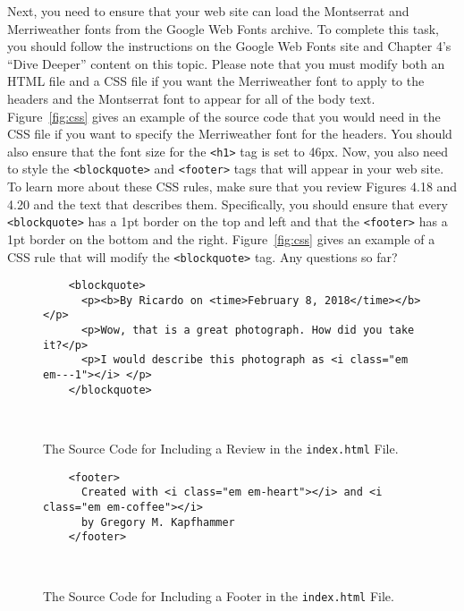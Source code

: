 \documentclass[11pt]{article}
\newcommand{\mainprogram}{\lstinline{index.html}}
\newcommand{\program}[1]{\lstinline{#1}}
\begin{document}
Next, you need to ensure that your web site can load the Montserrat and
Merriweather fonts from the Google Web Fonts archive. To complete this task, you
should follow the instructions on the Google Web Fonts site and Chapter 4's
``Dive Deeper'' content on this topic. Please note that you must modify both an
HTML file and a CSS file if you want the Merriweather font to apply to the
headers and the Montserrat font to appear for all of the body text.
Figure~\ref{fig:css} gives an example of the source code that you would need in
the CSS file if you want to specify the Merriweather font for the headers. You
should also ensure that the font size for the \program{<h1>} tag is set to 46px.
Now, you also need to style the \program{<blockquote>} and \program{<footer>}
tags that will appear in your web site. To learn more about these CSS rules,
make sure that you review Figures 4.18 and 4.20 and the text that describes
them. Specifically, you should ensure that every \program{<blockquote>} has a
1pt border on the top and left and that the \program{<footer>} has a 1pt border
on the bottom and the right. Figure~\ref{fig:css} gives an example of a CSS rule
that will modify the \program{<blockquote>} tag. Any questions so far?

\begin{figure}[t]
  \centering
  \begin{verbatim}
    <blockquote>
      <p><b>By Ricardo on <time>February 8, 2018</time></b></p>
      <p>Wow, that is a great photograph. How did you take it?</p>
      <p>I would describe this photograph as <i class="em em---1"></i> </p>
    </blockquote>
  \end{verbatim}
  \vspace*{-.35in}
  \caption{The Source Code for Including a Review in the \mainprogram{} File.}~\label{fig:code}
  \vspace*{-.1in}
\end{figure}

\begin{figure}[t]
  \centering
  \begin{verbatim}
    <footer>
      Created with <i class="em em-heart"></i> and <i class="em em-coffee"></i>
      by Gregory M. Kapfhammer
    </footer>
  \end{verbatim}
  \vspace*{-.35in}
  \caption{The Source Code for Including a Footer in the \mainprogram{} File.}~\label{fig:footer}
  \vspace*{-.25in}
\end{figure}
\end{document}
